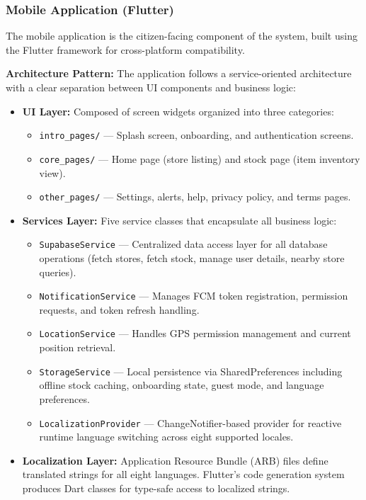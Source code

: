 \subsubsection{Mobile Application (Flutter)}

The mobile application is the citizen-facing component of the system, built using the Flutter framework for cross-platform compatibility.

\textbf{Architecture Pattern:}
The application follows a service-oriented architecture with a clear separation between UI components and business logic:

\begin{itemize}
    \item \textbf{UI Layer:} Composed of screen widgets organized into three categories:
    \begin{itemize}
        \item \texttt{intro\_pages/} --- Splash screen, onboarding, and authentication screens.
        \item \texttt{core\_pages/} --- Home page (store listing) and stock page (item inventory view).
        \item \texttt{other\_pages/} --- Settings, alerts, help, privacy policy, and terms pages.
    \end{itemize}

    \item \textbf{Services Layer:} Five service classes that encapsulate all business logic:
    \begin{itemize}
        \item \texttt{SupabaseService} --- Centralized data access layer for all database operations (fetch stores, fetch stock, manage user details, nearby store queries).
        \item \texttt{NotificationService} --- Manages FCM token registration, permission requests, and token refresh handling.
        \item \texttt{LocationService} --- Handles GPS permission management and current position retrieval.
        \item \texttt{StorageService} --- Local persistence via SharedPreferences including offline stock caching, onboarding state, guest mode, and language preferences.
        \item \texttt{LocalizationProvider} --- ChangeNotifier-based provider for reactive runtime language switching across eight supported locales.
    \end{itemize}

    \item \textbf{Localization Layer:} Application Resource Bundle (ARB) files define translated strings for all eight languages. Flutter's code generation system produces Dart classes for type-safe access to localized strings.
\end{itemize}


